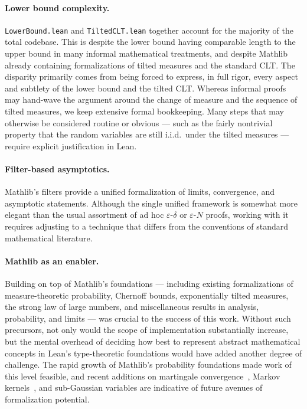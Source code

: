\documentclass{article}
\begin{document}
\paragraph{Lower bound complexity.}
\texttt{LowerBound.lean} and \texttt{TiltedCLT.lean} together account for the majority of the
total codebase. This is despite the lower bound having comparable length to the upper bound
in many informal mathematical treatments, and despite Mathlib already containing
formalizations of tilted measures and the standard CLT.
The disparity primarily comes from being forced to express, in full rigor, every aspect and
subtlety of the lower bound and the tilted CLT. Whereas informal proofs may hand-wave
the argument around the change of measure and the sequence of tilted measures, we keep extensive
formal bookkeeping. Many steps that may otherwise be considered routine or obvious --- such as the
fairly nontrivial property that the random variables are still i.i.d.\ under the tilted measures ---
require explicit justification in Lean.

\paragraph{Filter-based asymptotics.}
Mathlib's filters provide a unified formalization of limits, convergence, and asymptotic statements. Although the single unified framework is somewhat more elegant than the usual
assortment of ad hoc $\varepsilon$-$\delta$ or $\varepsilon$-$N$ proofs, working with it requires adjusting to a technique that differs from the conventions of standard mathematical literature.

\paragraph{Mathlib as an enabler.}
Building on top of Mathlib's foundations --- including existing formalizations of measure-theoretic
probability, Chernoff bounds, exponentially tilted measures, the strong law of large numbers, and
miscellaneous results in analysis, probability, and limits --- was crucial to the success of this
work.
Without such precursors, not only would the scope of implementation substantially increase, but the
mental overhead of deciding how best to represent abstract mathematical concepts in Lean's
type-theoretic foundations would have added another degree of challenge.
The rapid growth of Mathlib's probability foundations made work of this level feasible, and
recent additions on martingale convergence~\cite{ying2023martingale},
Markov kernels~\cite{degenne2025kernels}, and sub-Gaussian variables are indicative of future
avenues of formalization potential.
\end{document}
